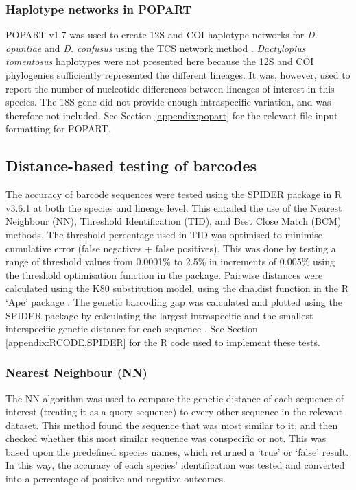 \subsubsection{Haplotype networks in POPART}
POPART v1.7 \citep{leigh2015popart} was used to create 12S and COI haplotype networks for \textit{D. opuntiae} and \textit{D. confusus} using the TCS network method \citep{clement2000tcs}. \textit{Dactylopius tomentosus} haplotypes were not presented here because the 12S and COI phylogenies sufficiently represented the different lineages. It was, however, used to report the number of nucleotide differences between lineages of interest in this species. 
The 18S gene did not provide enough intraspecific variation, and was therefore not included. See Section \ref{appendix:popart} for the relevant file input formatting for POPART.

\subsection{Distance-based testing of barcodes}
 The accuracy of barcode sequences were tested using the SPIDER package \citep{Brown2012Spider:Barcoding} in R v3.6.1 \citep{RCoreTeam2013R:Computing} at both the species and lineage level. This entailed the use of the Nearest Neighbour (NN), Threshold Identification (TID), and Best Close Match (BCM) methods. The threshold percentage used in TID was optimised to minimise cumulative error (false negatives + false positives). This was done by testing a range of threshold values from 0.0001\% to 2.5\% in increments of 0.005\% using the threshold optimisation function in the package. Pairwise distances were calculated using the K80 substitution model, using the dna.dist function in the R `Ape' package \citep{Paradis2004APE:Language}. The genetic barcoding gap was calculated and plotted using the SPIDER package by calculating the largest intraspecific and the smallest interspecific genetic distance for each sequence \citep{Meier2006DNASuccess}. See Section \ref{appendix:RCODE,SPIDER} for the R code used to implement these tests.
 
\subsubsection{Nearest Neighbour (NN)}
The NN algorithm was used to compare the genetic distance of each sequence of interest (treating it as a query sequence) to every other sequence in the relevant dataset. This method found the sequence that was most similar to it, and then checked whether this most similar sequence was conspecific or not. This was based upon the predefined species names, which returned a `true' or `false' result. In this way, the accuracy of each species' identification was tested and converted into a percentage of positive and negative outcomes. 


